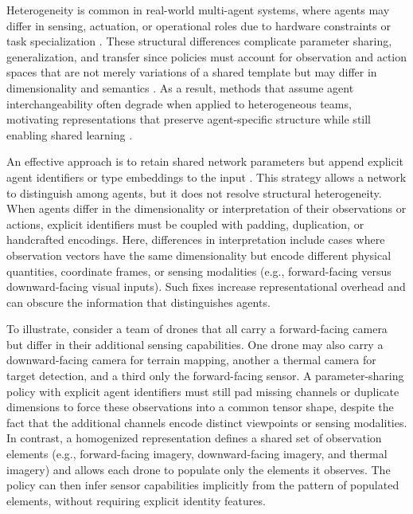 \documentclass[]{jair}
\begin{document}
Heterogeneity is common in real-world multi-agent systems, where agents may differ 
in sensing, actuation, or operational roles due to hardware constraints 
or task specialization \cite{calvo2018, cao2012}. 
These structural differences complicate parameter sharing, generalization, and transfer
since policies must account for observation and action spaces that are not merely 
variations of a shared template but may differ in dimensionality and semantics \cite{canese2021}. 
As a result, methods that assume agent interchangeability often degrade when applied to 
heterogeneous teams, motivating representations that preserve agent-specific structure 
while still enabling shared learning \cite{christianos2021, albrecht2024}.

An effective approach is to retain shared network parameters but append explicit agent 
identifiers or type embeddings to the input \cite{terry2020, christianos2021}. 
This strategy allows a network to distinguish among agents, 
but it does not resolve structural heterogeneity. 
When agents differ in the dimensionality or interpretation of their observations or actions,
explicit identifiers must be coupled with padding, duplication, or handcrafted encodings.
Here, differences in interpretation include cases where observation vectors have the same
dimensionality but encode different physical quantities, coordinate frames, or sensing
modalities (e.g., forward-facing versus downward-facing visual inputs).
Such fixes increase representational overhead and can obscure the information that
distinguishes agents.

To illustrate, consider a team of drones that all carry a forward-facing camera but 
differ in their additional sensing capabilities.
One drone may also carry a downward-facing camera for terrain mapping, 
another a thermal camera for target detection, and a third only the forward-facing sensor.
A parameter-sharing policy with explicit agent 
identifiers must still pad missing channels or duplicate dimensions 
to force these observations into a common tensor shape, despite the 
fact that the additional channels encode distinct viewpoints or sensing modalities.
In contrast, a homogenized representation defines a shared set of observation 
elements (e.g., forward-facing imagery, downward-facing imagery, and thermal imagery) 
and allows each drone to populate only the elements it observes.
The policy can then infer sensor capabilities implicitly from the pattern of 
populated elements, without requiring explicit identity features.
\end{document}
